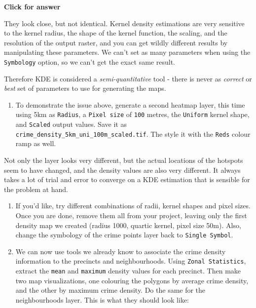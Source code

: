 \documentclass[
  letterpaper,
  DIV=11,
  numbers=noendperiod]{scrreprt}
\providecommand{\tightlist}{%
  \setlength{\itemsep}{0pt}\setlength{\parskip}{0pt}}\usepackage{longtable,booktabs,array}
\begin{document}
\begin{tcolorbox}[enhanced jigsaw, leftrule=.75mm, colframe=quarto-callout-important-color-frame, breakable, toprule=.15mm, bottomrule=.15mm, arc=.35mm, rightrule=.15mm, opacityback=0, colback=white, left=2mm]

\vspace{-3mm}\textbf{Click for answer}\vspace{3mm}

They look close, but not identical. Kernel density estimations are very
sensitive to the kernel radius, the shape of the kernel function, the
scaling, and the resolution of the output raster, and you can get wildly
different results by manipulating these parameters. We can't set as many
parameters when using the \texttt{Symbology} option, so we can't get the
exact same result.

Therefore KDE is considered a \emph{semi-quantitative} tool - there is
never as \emph{correct} or \emph{best} set of parameters to use for
generating the maps.

\end{tcolorbox}

\begin{enumerate}
\def\labelenumi{(\arabic{enumi})}
\setcounter{enumi}{341}
\tightlist
\item
  To demonstrate the issue above, generate a second heatmap layer, this
  time using 5km as \texttt{Radius}, a \texttt{Pixel\ size} of
  \texttt{100} metres, the \texttt{Uniform} kernel shape, and
  \texttt{Scaled} output values. Save it as
  \texttt{crime\_density\_5km\_uni\_100m\_scaled.tif}. The style it with
  the \texttt{Reds} colour ramp as well.
\end{enumerate}

Not only the layer looks very different, but the actual locations of the
hotspots seem to have changed, and the density values are also very
different. It always takes a lot of trial and error to converge on a KDE
estimation that is sensible for the problem at hand.

\begin{enumerate}
\def\labelenumi{(\arabic{enumi})}
\setcounter{enumi}{342}
\item
  If you'd like, try different combinations of radii, kernel shapes and
  pixel sizes. Once you are done, remove them all from your project,
  leaving only the first density map we created (radius 1000, quartic
  kernel, pixel size 50m). Also, change the symbology of the crime
  points layer back to \texttt{Single\ Symbol}.
\item
  We can now use tools we already know to associate the crime density
  information to the precincts and neighbourhoods. Using
  \texttt{Zonal\ Statistics}, extract the \texttt{mean} and
  \texttt{maximum} density values for each precinct. Then make two map
  visualizations, one colouring the polygons by average crime density,
  and the other by maximum crime density. Do the same for the
  neighbourhoods layer. This is what they should look like:
\end{enumerate}
\end{document}
